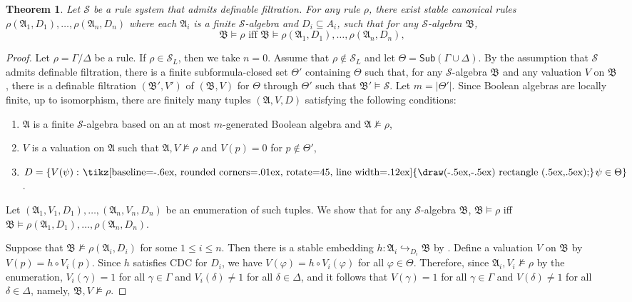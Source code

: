 \documentclass[a4paper,11pt]{article}
\newtheorem{theorem}{Theorem}
\theoremstyle{definition}
\theoremstyle{remark}
\numberwithin{theorem}{section}
\newcommand{\alg}[1]{\mathfrak{#1}}
\newcommand{\A}{\alg{A}}
\newcommand{\B}{\alg{B}}
\newcommand{\class}[1]{\mathcal{#1}}
\renewcommand{\S}{\class{S}}
\newcommand{\Sub}{\mathsf{Sub}}
\renewcommand{\phi}{\varphi}
\newcommand{\gooddiamond}{\hspace{.2ex}\text{%
  \tikz[baseline=-.6ex, rounded corners=.01ex, rotate=45, line width=.12ex]
    {\draw(-.5ex,-.5ex) rectangle (.5ex,.5ex);}}\kern.2ex}
\renewcommand{\Diamond}{\gooddiamond}
\newcommand{\Dia}{\Diamond}
\newcommand{\inj}{\hookrightarrow}
\renewcommand{\S}{\mathcal{S}}
\begin{document}
\begin{theorem} \label{3: Thm scr complete} 
    Let $\S$ be a rule system that admits definable filtration. For any rule $\rho$, there exist stable canonical rules $\rho(\A_1, D_1), \dots, \rho(\A_n, D_n)$ where each $\A_i$ is a finite $\S$-algebra and $D_i \subseteq A_i$, such that for any $\S$-algebra $\B$,
    \[\B \models \rho \text{ iff } \B \models\rho(\A_1, D_1), \dots, \rho(\A_n, D_n),\]
\end{theorem}

\begin{proof}
    Let $\rho = \Gamma/\Delta$ be a rule. If $\rho \in \S_L$, then we take $n=0$. Assume that $\rho \notin \S_L$ and let $\Theta = \Sub(\Gamma \cup \Delta)$. By the assumption that $\S$ admits definable filtration, there is a finite subformula-closed set $\Theta'$ containing $\Theta$ such that, for any $\S$-algebra $\B$ and any valuation $V$ on $\B$, there is a definable filtration $(\B', V')$ of $(\B, V)$ for $\Theta$ through $\Theta'$ such that $\B' \models \S$. Let $m = |\Theta'|$. Since Boolean algebras are locally finite, up to isomorphism, there are finitely many tuples $(\A, V, D)$ satisfying the following conditions:
    \begin{enumerate}
        \item $\A$ is a finite $\S$-algebra based on an at most $m$-generated Boolean algebra and $\A \not\models \rho$,
        \item $V$ is a valuation on $\A$ such that $\A, V \not\models \rho$ and $V(p) = 0$ for $p \notin \Theta'$,
        \item $D = \{V(\psi): \Dia\psi \in \Theta\}$.
    \end{enumerate}
    Let $(\A_1, V_1, D_1), \dots, (\A_n, V_n, D_n)$ be an enumeration of such tuples. We show that for any $\S$-algebra $\B$, $\B \models \rho$ iff $ \B \models\rho(\A_1, D_1), \dots, \rho(\A_n, D_n)$.

    Suppose that $\B \not\models \rho(\A_i, D_i)$ for some $1 \leq i \leq n$. Then there is a stable embedding $h: \A_i \inj_{D_i} \B$ by . Define a valuation $V$ on $\B$ by $V(p) = h \circ V_i (p)$. Since $h$ satisfies CDC for $D_i$, we have $V(\phi) = h \circ V_i (\phi)$ for all $\phi \in \Theta$. Therefore, since $\A_i, V_i \not\models \rho$ by the enumeration, $V_i(\gamma) = 1$ for all $\gamma \in \Gamma$ and $V_i(\delta) \neq 1$ for all $\delta \in \Delta$, and it follows that $V(\gamma) = 1$ for all $\gamma \in \Gamma$ and $V(\delta) \neq 1$ for all $\delta \in \Delta$, namely, $\B, V \not\models \rho$.


\end{proof}
\end{document}
